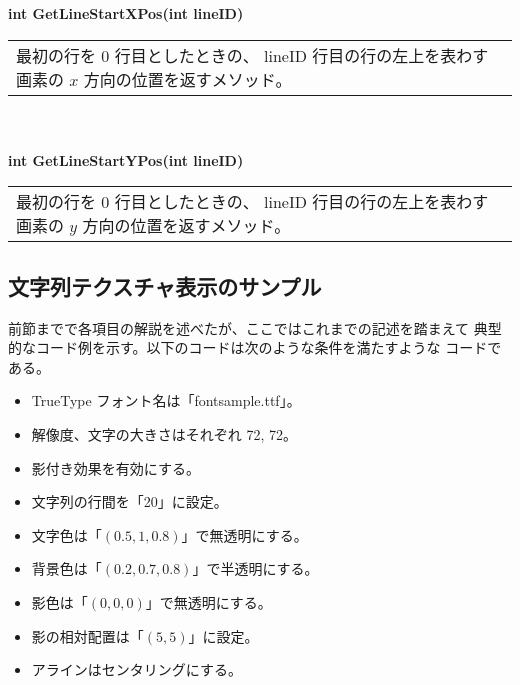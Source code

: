 \begin{tabbing}
\> \textbf{int GetLineStartXPos(int lineID)} \\
	\> \> \begin{tabular}{p{15cm}}
		最初の行を 0 行目としたときの、
		lineID 行目の行の左上を表わす画素の \(x\) 方向の位置を返すメソッド。
	\end{tabular} \\ \\
\> \textbf{int GetLineStartYPos(int lineID)} \\
	\> \> \begin{tabular}{p{15cm}}
		最初の行を 0 行目としたときの、
		lineID 行目の行の左上を表わす画素の \(y\) 方向の位置を返すメソッド。
	\end{tabular}
\end{tabbing}

\subsection{文字列テクスチャ表示のサンプル}
前節までで各項目の解説を述べたが、ここではこれまでの記述を踏まえて
典型的なコード例を示す。以下のコードは次のような条件を満たすような
コードである。
\begin{itemize}
 \item TrueType フォント名は「fontsample.ttf」。
 \item 解像度、文字の大きさはそれぞれ 72, 72。
 \item 影付き効果を有効にする。
 \item 文字列の行間を「20」に設定。
 \item 文字色は「\((0.5, 1, 0.8)\)」で無透明にする。
 \item 背景色は「\((0.2, 0.7, 0.8)\)」で半透明にする。
 \item 影色は「\((0, 0, 0)\)」で無透明にする。
 \item 影の相対配置は「\((5, 5)\)」に設定。
 \item アラインはセンタリングにする。
\end{itemize}
~ \\
